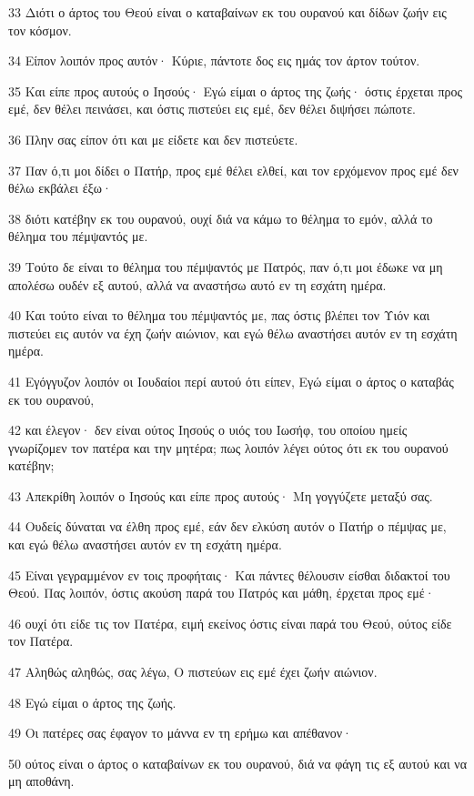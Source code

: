 \par 33 Διότι ο άρτος του Θεού είναι ο καταβαίνων εκ του ουρανού και δίδων ζωήν εις τον κόσμον.
\par 34 Είπον λοιπόν προς αυτόν· Κύριε, πάντοτε δος εις ημάς τον άρτον τούτον.
\par 35 Και είπε προς αυτούς ο Ιησούς· Εγώ είμαι ο άρτος της ζωής· όστις έρχεται προς εμέ, δεν θέλει πεινάσει, και όστις πιστεύει εις εμέ, δεν θέλει διψήσει πώποτε.
\par 36 Πλην σας είπον ότι και με είδετε και δεν πιστεύετε.
\par 37 Παν ό,τι μοι δίδει ο Πατήρ, προς εμέ θέλει ελθεί, και τον ερχόμενον προς εμέ δεν θέλω εκβάλει έξω·
\par 38 διότι κατέβην εκ του ουρανού, ουχί διά να κάμω το θέλημα το εμόν, αλλά το θέλημα του πέμψαντός με.
\par 39 Τούτο δε είναι το θέλημα του πέμψαντός με Πατρός, παν ό,τι μοι έδωκε να μη απολέσω ουδέν εξ αυτού, αλλά να αναστήσω αυτό εν τη εσχάτη ημέρα.
\par 40 Και τούτο είναι το θέλημα του πέμψαντός με, πας όστις βλέπει τον Υιόν και πιστεύει εις αυτόν να έχη ζωήν αιώνιον, και εγώ θέλω αναστήσει αυτόν εν τη εσχάτη ημέρα.
\par 41 Εγόγγυζον λοιπόν οι Ιουδαίοι περί αυτού ότι είπεν, Εγώ είμαι ο άρτος ο καταβάς εκ του ουρανού,
\par 42 και έλεγον· δεν είναι ούτος Ιησούς ο υιός του Ιωσήφ, του οποίου ημείς γνωρίζομεν τον πατέρα και την μητέρα; πως λοιπόν λέγει ούτος ότι εκ του ουρανού κατέβην;
\par 43 Απεκρίθη λοιπόν ο Ιησούς και είπε προς αυτούς· Μη γογγύζετε μεταξύ σας.
\par 44 Ουδείς δύναται να έλθη προς εμέ, εάν δεν ελκύση αυτόν ο Πατήρ ο πέμψας με, και εγώ θέλω αναστήσει αυτόν εν τη εσχάτη ημέρα.
\par 45 Είναι γεγραμμένον εν τοις προφήταις· Και πάντες θέλουσιν είσθαι διδακτοί του Θεού. Πας λοιπόν, όστις ακούση παρά του Πατρός και μάθη, έρχεται προς εμέ·
\par 46 ουχί ότι είδε τις τον Πατέρα, ειμή εκείνος όστις είναι παρά του Θεού, ούτος είδε τον Πατέρα.
\par 47 Αληθώς αληθώς, σας λέγω, Ο πιστεύων εις εμέ έχει ζωήν αιώνιον.
\par 48 Εγώ είμαι ο άρτος της ζωής.
\par 49 Οι πατέρες σας έφαγον το μάννα εν τη ερήμω και απέθανον·
\par 50 ούτος είναι ο άρτος ο καταβαίνων εκ του ουρανού, διά να φάγη τις εξ αυτού και να μη αποθάνη.
